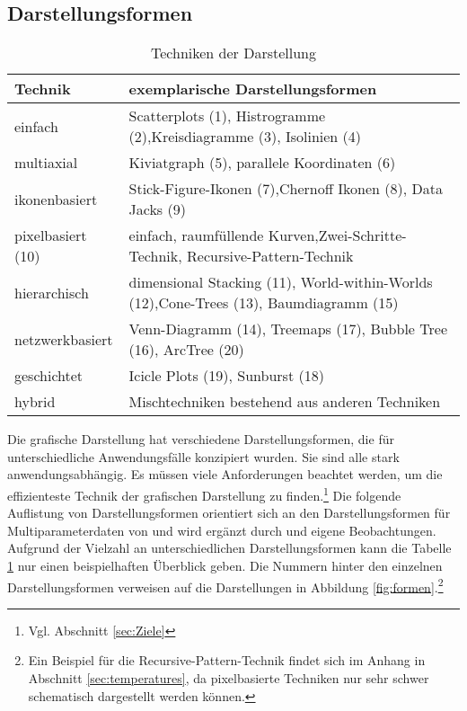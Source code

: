 \documentclass[a4paper, 
               12pt,
               DIV=calc,
               version=first,
               pdftex,
               headsepline,
               footsepline,
               bibtotocnumbered,
               liststotocnumbered]{scrreprt}
\begin{document}
\subsection{Darstellungsformen}
\label{sec:Darstellungsformen}
\begin{table}
\centering
\begin{tabular}{|l|p{10cm}|}
\hline
\textbf{Technik} & \textbf{exemplarische Darstellungsformen}\\
\hline
einfach & Scatterplots (1), Histrogramme (2),Kreisdiagramme (3), Isolinien (4)\\
\hline
multiaxial & Kiviatgraph (5), parallele Koordinaten (6)\\
\hline
ikonenbasiert & Stick-Figure-Ikonen (7),Chernoff Ikonen (8), Data Jacks (9)\\
\hline
pixelbasiert (10) &
einfach, raumfüllende Kurven,Zwei-Schritte-Technik, Recursive-Pattern-Technik\\
\hline
hierarchisch & dimensional Stacking (11), World-within-Worlds (12),Cone-Trees (13), Baumdiagramm (15)\\
\hline
netzwerkbasiert & Venn-Diagramm (14), Treemaps (17), Bubble Tree (16), ArcTree (20)\\
\hline
geschichtet & Icicle Plots (19), Sunburst (18)\\
\hline
hybrid & Mischtechniken bestehend aus anderen Techniken\\
\hline
\end{tabular}
\caption{Techniken der Darstellung}
\label{tab:darstellungsformen}
\end{table}

Die grafische Darstellung hat verschiedene Darstellungsformen, die für unterschiedliche
Anwendungsfälle konzipiert wurden. Sie sind alle stark anwendungsabhängig. Es müssen viele
Anforderungen beachtet werden, um die effizienteste Technik der grafischen Darstellung zu
finden.\footnote{Vgl. Abschnitt \ref{sec:Ziele}}
Die folgende Auflistung von Darstellungsformen orientiert sich an den Darstellungsformen für
Multiparameterdaten von \cite{Schumann} und
wird ergänzt durch \cite{Preim} und eigene Beobachtungen. Aufgrund der Vielzahl an unterschiedlichen
Darstellungsformen kann die Tabelle \ref{tab:darstellungsformen} nur einen beispielhaften Überblick geben. Die
Nummern hinter den einzelnen Darstellungsformen verweisen auf die Darstellungen in 
Abbildung \ref{fig:formen}.\footnote{Ein Beispiel für die Recursive-Pattern-Technik
findet sich im Anhang in Abschnitt \ref{sec:temperatures}, da pixelbasierte
Techniken nur sehr schwer schematisch dargestellt werden können.}
\end{document}
